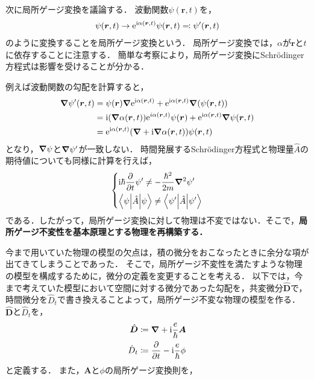 \documentclass{report}
\begin{document}
  次に局所ゲージ変換を議論する．
  波動関数$\psi(\bm{r}, t)$を，
  \begin{align}
    \psi(\bm{r}, t) \to \mathrm{e}^{\mathrm{i}\alpha(\bm{r}, t)}\psi(\bm{r}, t) \eqqcolon \psi'(\bm{r}, t)
  \end{align}
  のように変換することを局所ゲージ変換という．
  局所ゲージ変換では，$\alpha$が$\bm{r}$と$t$に依存することに注意する．
  簡単な考察により，局所ゲージ変換にSchr\"odinger方程式は影響を受けることが分かる．
  \par
  例えば波動関数の勾配を計算すると，
  \begin{align}
    \grad\psi'(\bm{r}, t) &= \psi(\bm{r})\grad\mathrm{e}^{\mathrm{i}\alpha(\bm{r}, t)} + \mathrm{e}^{\mathrm{i}\alpha(\bm{r}, t)}\grad\qty(\psi(\bm{r}, t)) \\ 
    &= \mathrm{i}\qty(\grad\alpha(\bm{r}, t))  \mathrm{e}^{i\alpha(\bm{r}, t)}\psi(\bm{r}) + \mathrm{e}^{\mathrm{i}\alpha(\bm{r}, t)}\grad\psi(\bm{r}, t) \\ 
    &= \mathrm{e}^{\mathrm{i}\alpha(\bm{r}, t)}(\grad + \mathrm{i}\grad\alpha(\bm{r}, t))\psi(\bm{r}, t) 
  \end{align}
  となり，$\grad\psi$と$\grad\psi'$が一致しない．
  時間発展するSchr\"odinger方程式と物理量$\hat{A}$の期待値についても同様に計算を行えば，
  \begin{align}
    \begin{dcases}
      \mathrm{i}\hbar\pdv{t}\psi' \neq - \frac{\hbar^2}{2m}\grad^2\psi' \\
      \mel**{\psi}{\hat{A}}{\psi} \neq \mel**{\psi'}{\hat{A}}{\psi'}
    \end{dcases}
  \end{align}
  である．したがって，局所ゲージ変換に対して物理は不変ではない．そこで，\textbf{局所ゲージ不変性を基本原理とする物理を再構築する．}%
  \par
  今まで用いていた物理の模型の欠点は，積の微分をおこなったときに余分な項が出てきてしまうことであった．
  そこで，局所ゲージ不変性を満たすような物理の模型を構成するために，微分の定義を変更することを考える．
  以下では，今まで考えていた模型において空間に対する微分であった勾配を，共変微分$\hat{\bm{D}}$で，時間微分を$\hat{D}_t$で書き換えることよって，局所ゲージ不変な物理の模型を作る．
  $\hat{\bm{D}}$と$\hat{D}_t$を，
  \begin{align}
    \hat{\bm{D}} &\coloneqq \grad + \mathrm{i}\frac{e}{\hbar}\bm{A} \label{hatd-def}\\ 
    \hat{D}_t &\coloneqq \pdv{t} - \mathrm{i}\frac{e}{\hbar}\phi \label{hatdt-def}
  \end{align}
  と定義する．
  また，$\bm{A}$と$\phi$の局所ゲージ変換則を，
\end{document}
